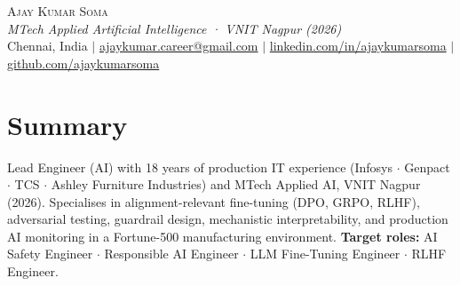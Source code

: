 \documentclass[letterpaper,11pt]{article}
\begin{document}
\begin{center}
  {\Huge \scshape Ajay Kumar Soma} \\[3pt]
  {\small\itshape MTech Applied Artificial Intelligence · VNIT Nagpur (2026)} \\[4pt]
  \small
  Chennai, India \quad$|$\quad
  \href{mailto:ajaykumar.career@gmail.com}{ajaykumar.career@gmail.com} \quad$|$\quad
  \href{https://linkedin.com/in/ajaykumarsoma}{linkedin.com/in/ajaykumarsoma} \quad$|$\quad
  \href{https://github.com/ajaykumarsoma}{github.com/ajaykumarsoma}
\end{center}

\section{Summary}
Lead Engineer (AI) with 18 years of production IT experience
(Infosys $\cdot$ Genpact $\cdot$ TCS $\cdot$ Ashley Furniture Industries)
and MTech Applied AI, VNIT Nagpur (2026).
Specialises in alignment-relevant fine-tuning (DPO, GRPO, RLHF),
adversarial testing, guardrail design, mechanistic interpretability,
and production AI monitoring in a Fortune-500 manufacturing environment.
\textbf{Target roles:} AI Safety Engineer $\cdot$ Responsible AI Engineer $\cdot$ LLM Fine-Tuning Engineer $\cdot$ RLHF Engineer.

\end{document}
